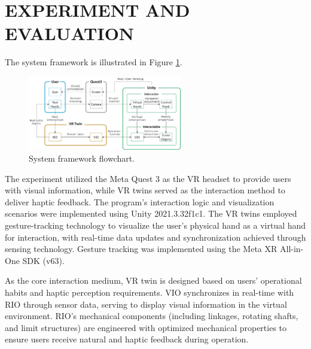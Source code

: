 \documentclass[sigconf,review,anonymous]{acmart}
\begin{document}
\section{EXPERIMENT AND EVALUATION}
The system framework is illustrated in Figure \ref{fig:system-framework-flowchart}.

\begin{figure}[t]
  \centering
  \includegraphics[width=0.6\textwidth]{image/system-framework-flowchart.pdf}
  \caption{System framework flowchart.}
  \label{fig:system-framework-flowchart}
\end{figure}

The experiment utilized the Meta Quest 3 as the VR headset to provide users with visual information, while VR twins served as the interaction method to deliver haptic feedback. The program's interaction logic and visualization scenarios were implemented using Unity 2021.3.32f1c1. The VR twins employed gesture-tracking technology to visualize the user's physical hand as a virtual hand for interaction, with real-time data updates and synchronization achieved through sensing technology. Gesture tracking was implemented using the Meta XR All-in-One SDK (v63).

As the core interaction medium, VR twin is designed based on users' operational habits and haptic perception requirements. VIO synchronizes in real-time with RIO through sensor data, serving to display visual information in the virtual environment. RIO's mechanical components (including linkages, rotating shafts, and limit structures) are engineered with optimized mechanical properties to ensure users receive natural and haptic feedback during operation.
\end{document}
